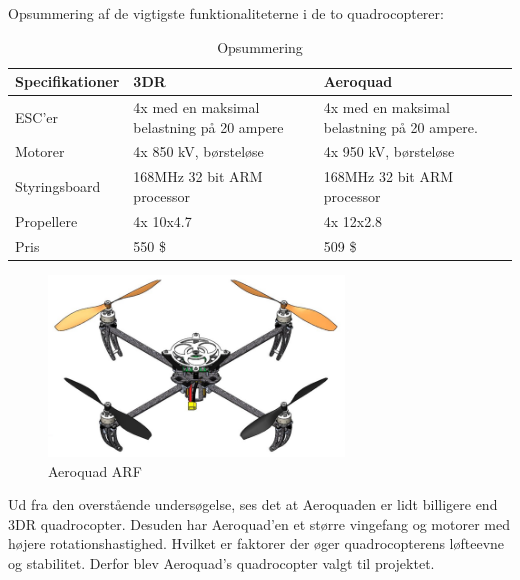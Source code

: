 \newpage

Opsummering af de vigtigste funktionaliteterne i de to quadrocopterer:
\begin{table}[H]
	\centering
		\begin{tabular}{|p{3.5cm}|p{5 cm}|p{5 cm}|} 
		\hline
			\textbf{Specifikationer} & \textbf{3DR} 	& \textbf{Aeroquad} \\ \hline
					ESC'er &  4x med en maksimal belastning på 20 ampere				& 4x med en maksimal belastning på 20 ampere.	\\ \hline
			 		Motorer	& 4x 850 kV, børsteløse	& 4x 950 kV, børsteløse			\\ \hline
			 		Styringsboard	& 168MHz 32 bit ARM processor				& 168MHz 32 bit ARM processor		\\ \hline
			 			Propellere & 4x 10x4.7 			& 4x 12x2.8					\\ \hline
			 			Pris & 	550 \$	& 509 \$				\\ \hline
		\end{tabular}
	\caption{Opsummering}
\end{table}

\vspace{1cm}

\begin{figure}[H]
\centering
\includegraphics[width=0.7\textwidth]{Billeder/drone.png}
\caption{Aeroquad ARF}
\label{fig:Aeroquad ARF}
\end{figure}

\vspace{1cm}


Ud fra den overstående undersøgelse, ses det at Aeroquaden er lidt billigere end 3DR quadrocopter. Desuden har Aeroquad'en et større vingefang og motorer med højere rotationshastighed. Hvilket er faktorer der øger quadrocopterens løfteevne og stabilitet. Derfor blev Aeroquad's quadrocopter valgt til projektet.


